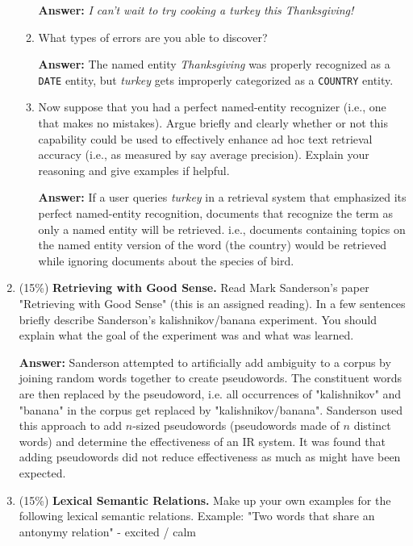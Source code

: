 \documentclass[11pt]{article}
\begin{document}
\begin{enumerate}
\begin{enumerate}
                        \textbf{Answer:} \textit{I can't wait to try cooking a turkey this Thanksgiving!}

                  \item What types of errors are you able to discover?

                        \textbf{Answer:} The named entity \textit{Thanksgiving} was properly recognized as a \texttt{DATE} entity, but \textit{turkey} gets improperly categorized as a \texttt{COUNTRY} entity.

                  \item Now suppose that you had a perfect named-entity recognizer (i.e., one that makes no mistakes). Argue briefly and clearly whether or not this capability could be used to effectively enhance ad hoc text retrieval accuracy (i.e., as measured by say average precision). Explain your reasoning and give examples if helpful.

                        \textbf{Answer:} If a user queries \textit{turkey} in a retrieval system that emphasized its perfect named-entity recognition, documents that recognize the term as only a named entity will be retrieved. i.e., documents containing topics on the named entity version of the word (the country) would be retrieved while ignoring documents about the species of bird.

            \end{enumerate}

      \item (15\%) \textbf{Retrieving with Good Sense.} Read Mark Sanderson's paper "Retrieving with Good Sense" (this is an assigned reading). In a few sentences briefly describe Sanderson's kalishnikov/banana experiment. You should explain what the goal of the experiment was and what was learned.

            \textbf{Answer:} Sanderson attempted to artificially add ambiguity to a corpus by joining random words together to create pseudowords. The constituent words are then replaced by the pseudoword, i.e. all occurrences of "kalishnikov" and "banana" in the corpus get replaced by "kalishnikov/banana". Sanderson used this approach to add $n$-sized pseudowords (pseudowords made of $n$ distinct words) and determine the effectiveness of an IR system. It was found that adding pseudowords did not reduce effectiveness as much as might have been expected.

      \item (15\%) \textbf{Lexical Semantic Relations.} Make up your own examples for the following lexical semantic relations. Example: "Two words that share an antonymy relation" - excited / calm


\end{enumerate}
\end{document}
